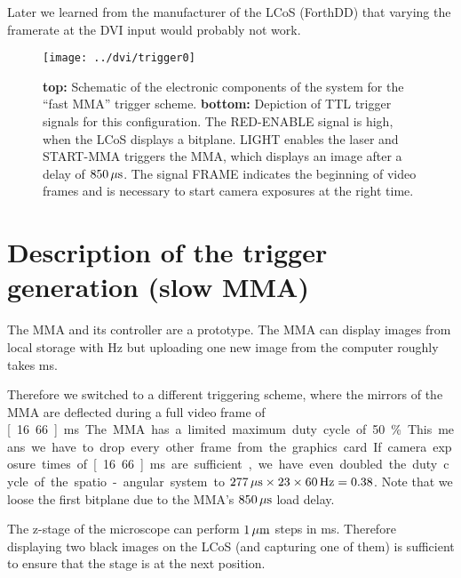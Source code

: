 Later we learned from the manufacturer of the LCoS (ForthDD) that
varying the framerate at the DVI input would probably not work.

\begin{figure}[!hbt]
  \centering
  \texttt{[image: ../dvi/trigger0]}
  \caption{{\bf top:} Schematic of the electronic components of the
    system for the ``fast MMA'' trigger scheme. {\bf bottom:}
    Depiction of TTL trigger signals for this configuration. The
    \textsf{RED-ENABLE} signal is high, when the LCoS displays a
    bitplane. \textsf{LIGHT} enables the laser and \textsf{START-MMA}
    triggers the MMA, which displays an image after a delay of
    $\unit[850]{\mu s}$. The signal \textsf{FRAME} indicates the
    beginning of video frames and is necessary to start camera
    exposures at the right time.}
  \label{fig:trigger0}
\end{figure}


\section{Description of the trigger generation (slow MMA)}
\label{sec:dvi_slow}
The MMA and its controller are a prototype. The MMA can display images
from local storage with \unit[660]{Hz} but uploading one new image
from the computer roughly takes \unit[80]{ms}.

Therefore we switched to a different triggering scheme, where the
mirrors of the MMA are deflected during a full video frame of
\unit[16.66]{ms}. The MMA has a limited maximum duty cycle of
50\%. This means we have to drop every other frame from the graphics
card. If camera exposure times of \unit[16.66]{ms} are sufficient, we
have even doubled the duty cycle of the spatio-angular system to
$\unit[277]{\mu s}\times23\times\unit[60]{Hz}=0.38$. Note that we
loose the first bitplane due to the MMA's $\unit[850]{\mu s}$ load
delay.

The z-stage of the microscope can perform $\unit[1]{\mu m}$ steps in
\unit[20]{ms}. Therefore displaying two black images on the LCoS (and
capturing one of them) is sufficient to ensure that the stage is at
the next position.

